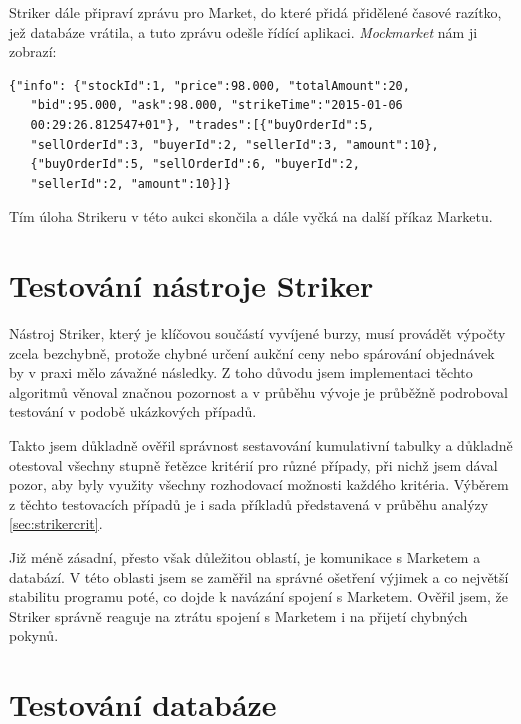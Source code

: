 \documentclass[thesis=M,czech]{FITthesis}[2012/06/26]
\begin{document}
Striker dále připraví zprávu pro Market, do které přidá přidělené časové razítko, jež databáze vrátila, a tuto zprávu odešle 
řídící aplikaci. \textit{Mockmarket} nám ji zobrazí: 

\begin{lstlisting}[basicstyle={\small\ttfamily}] 
   {"info": {"stockId":1, "price":98.000, "totalAmount":20, 
   "bid":95.000, "ask":98.000, "strikeTime":"2015-01-06 
   00:29:26.812547+01"}, "trades":[{"buyOrderId":5, 
   "sellOrderId":3, "buyerId":2, "sellerId":3, "amount":10}, 
   {"buyOrderId":5, "sellOrderId":6, "buyerId":2, 
   "sellerId":2, "amount":10}]}
\end{lstlisting}

Tím úloha Strikeru v této aukci skončila a dále vyčká na další příkaz Marketu.


\section{Testování nástroje Striker}

Nástroj Striker, který je klíčovou součástí vyvíjené burzy, musí provádět výpočty zcela bezchybně, protože chybné 
určení aukční ceny nebo spárování objednávek by v praxi mělo závažné následky. Z toho důvodu jsem implementaci 
těchto algoritmů věnoval značnou pozornost a v průběhu vývoje je průběžně podroboval testování v podobě 
ukázkových případů. 

Takto jsem důkladně ověřil správnost sestavování kumulativní tabulky a důkladně otestoval všechny stupně řetězce 
kritérií pro různé případy, při nichž jsem dával pozor, aby byly využity 
všechny rozhodovací možnosti každého kritéria. Výběrem z těchto testovacích případů je i sada příkladů představená 
v průběhu analýzy \ref{sec:strikercrit}.

Již méně zásadní, přesto však důležitou oblastí, je komunikace s Marketem a databází. V této oblasti jsem se zaměřil 
na správné ošetření výjimek a co největší stabilitu programu poté, co dojde k navázání spojení s Marketem. Ověřil 
jsem, že Striker správně reaguje na ztrátu spojení s Marketem i na přijetí chybných pokynů.


\section{Testování databáze}
\end{document}
